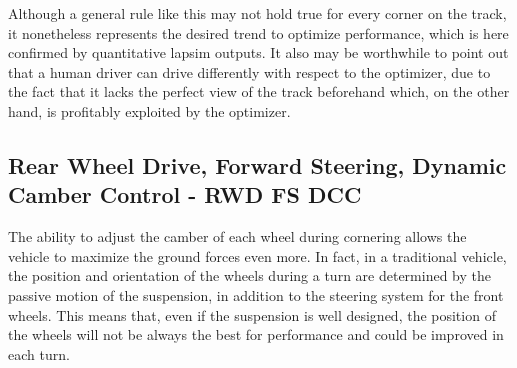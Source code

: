 Although a general rule like this may not hold true for every corner on the track, it nonetheless represents the desired trend to optimize performance, which is here confirmed by quantitative lapsim outputs.
It also may be worthwhile to point out that a human driver can drive differently with respect to the optimizer, due to the fact that it lacks the perfect view of the track beforehand which, on the other hand, is profitably exploited by the optimizer.


\subsection{Rear Wheel Drive, Forward Steering, Dynamic Camber Control - RWD FS DCC}
The ability to adjust the camber of each wheel during cornering allows the vehicle to maximize the ground forces even more. In fact, in a traditional vehicle, the position and orientation of the wheels during a turn are determined by the passive motion of the suspension, in addition to the steering system for the front wheels. This means that, even if the suspension is well designed, the position of the wheels will not be always the best for performance and could be improved in each turn.

